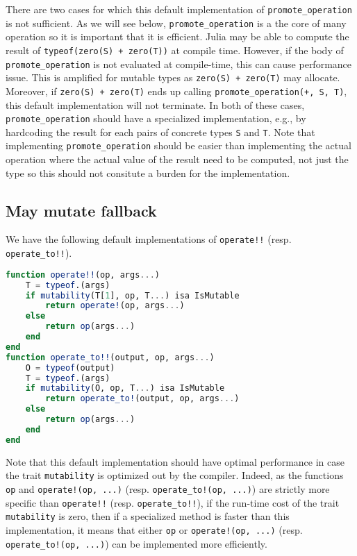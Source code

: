 \documentclass{juliacon}
\begin{document}
There are two cases for which this default implementation of \lstinline|promote_operation| is not sufficient.
As we will see below, \lstinline|promote_operation| is a the core of many operation so it is important that it is efficient.
Julia may be able to compute the result of \lstinline|typeof(zero(S) + zero(T))| at compile time.
However, if the body of \lstinline|promote_operation| is not evaluated at compile-time, this can cause performance issue.
This is amplified for mutable types as \lstinline|zero(S) + zero(T)| may allocate.
Moreover, if \lstinline|zero(S) + zero(T)| ends up calling \lstinline|promote_operation(+, S, T)|, this default implementation will not terminate.
In both of these cases, \lstinline|promote_operation| should have a specialized implementation, e.g., by hardcoding the result for each pairs of concrete types \lstinline|S| and \lstinline|T|.
Note that implementing \lstinline|promote_operation| should be easier than implementing the actual operation where the actual value of the result need to be computed, not just the type so this should not consitute a burden for the implementation.

\subsection{May mutate fallback}
We have the following default implementations of \lstinline|operate!!| (resp. \lstinline|operate_to!!|).
\begin{lstlisting}[language = Julia]
function operate!!(op, args...)
    T = typeof.(args)
    if mutability(T[1], op, T...) isa IsMutable
        return operate!(op, args...)
    else
        return op(args...)
    end
end
function operate_to!!(output, op, args...)
    O = typeof(output)
    T = typeof.(args)
    if mutability(O, op, T...) isa IsMutable
        return operate_to!(output, op, args...)
    else
        return op(args...)
    end
end
\end{lstlisting}
Note that this default implementation should have optimal performance in case the trait \lstinline|mutability| is optimized out by the compiler.
Indeed, as the functions \lstinline|op| and \lstinline|operate!(op, ...)| (resp. \lstinline|operate_to!(op, ...)|) are strictly more specific than \lstinline|operate!!| (resp. \lstinline|operate_to!!|),
if the run-time cost of the trait \lstinline|mutability| is zero,
then if a specialized method is faster than this implementation,
it means that either
\lstinline|op| or \lstinline|operate!(op, ...)| (resp. \lstinline|operate_to!(op, ...)|)
can be implemented more efficiently.
\end{document}
